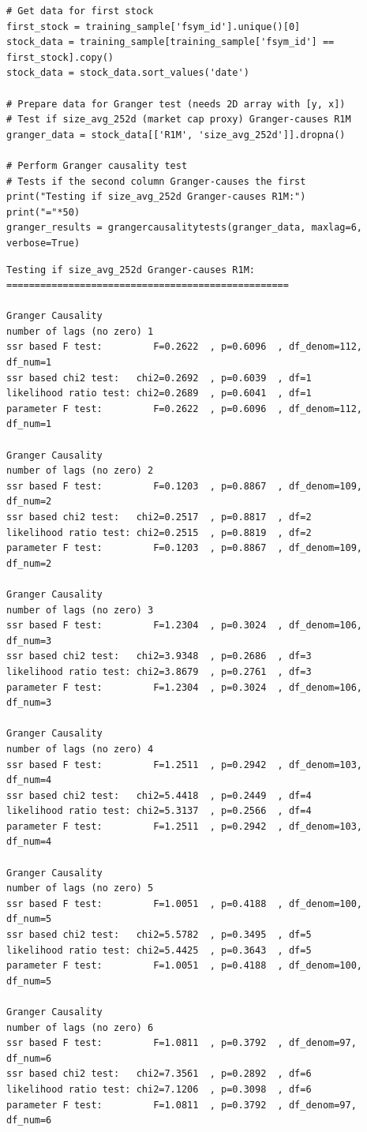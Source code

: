 \begin{verbatim}
# Get data for first stock
first_stock = training_sample['fsym_id'].unique()[0]
stock_data = training_sample[training_sample['fsym_id'] == first_stock].copy()
stock_data = stock_data.sort_values('date')

# Prepare data for Granger test (needs 2D array with [y, x])
# Test if size_avg_252d (market cap proxy) Granger-causes R1M
granger_data = stock_data[['R1M', 'size_avg_252d']].dropna()

# Perform Granger causality test
# Tests if the second column Granger-causes the first
print("Testing if size_avg_252d Granger-causes R1M:")
print("="*50)
granger_results = grangercausalitytests(granger_data, maxlag=6, verbose=True)
\end{verbatim}

\begin{verbatim}
Testing if size_avg_252d Granger-causes R1M:
==================================================

Granger Causality
number of lags (no zero) 1
ssr based F test:         F=0.2622  , p=0.6096  , df_denom=112, df_num=1
ssr based chi2 test:   chi2=0.2692  , p=0.6039  , df=1
likelihood ratio test: chi2=0.2689  , p=0.6041  , df=1
parameter F test:         F=0.2622  , p=0.6096  , df_denom=112, df_num=1

Granger Causality
number of lags (no zero) 2
ssr based F test:         F=0.1203  , p=0.8867  , df_denom=109, df_num=2
ssr based chi2 test:   chi2=0.2517  , p=0.8817  , df=2
likelihood ratio test: chi2=0.2515  , p=0.8819  , df=2
parameter F test:         F=0.1203  , p=0.8867  , df_denom=109, df_num=2

Granger Causality
number of lags (no zero) 3
ssr based F test:         F=1.2304  , p=0.3024  , df_denom=106, df_num=3
ssr based chi2 test:   chi2=3.9348  , p=0.2686  , df=3
likelihood ratio test: chi2=3.8679  , p=0.2761  , df=3
parameter F test:         F=1.2304  , p=0.3024  , df_denom=106, df_num=3

Granger Causality
number of lags (no zero) 4
ssr based F test:         F=1.2511  , p=0.2942  , df_denom=103, df_num=4
ssr based chi2 test:   chi2=5.4418  , p=0.2449  , df=4
likelihood ratio test: chi2=5.3137  , p=0.2566  , df=4
parameter F test:         F=1.2511  , p=0.2942  , df_denom=103, df_num=4

Granger Causality
number of lags (no zero) 5
ssr based F test:         F=1.0051  , p=0.4188  , df_denom=100, df_num=5
ssr based chi2 test:   chi2=5.5782  , p=0.3495  , df=5
likelihood ratio test: chi2=5.4425  , p=0.3643  , df=5
parameter F test:         F=1.0051  , p=0.4188  , df_denom=100, df_num=5

Granger Causality
number of lags (no zero) 6
ssr based F test:         F=1.0811  , p=0.3792  , df_denom=97, df_num=6
ssr based chi2 test:   chi2=7.3561  , p=0.2892  , df=6
likelihood ratio test: chi2=7.1206  , p=0.3098  , df=6
parameter F test:         F=1.0811  , p=0.3792  , df_denom=97, df_num=6
\end{verbatim}


